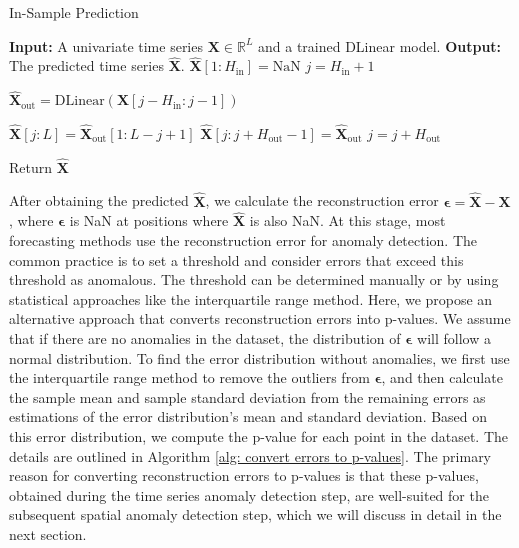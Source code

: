 \documentclass[11pt]{article}
\begin{document}
\begin{algorithm}
\caption{In-Sample Prediction}\label{alg: in-sample prediction}
\begin{algorithmic}[1] %
\State \textbf{Input:} A univariate time series $\bm{X} \in \mathbb{R}^L$ and a trained DLinear model.
\State \textbf{Output:} The predicted time series $\hat{\bm{X}}$.
\State $\hat{\bm{X}}[1:H_{\mathrm{in}}] = \mathrm{NaN}$ %
\State $j = H_{\mathrm{in}} + 1$ %

    \State $\hat{\bm{X}}_{\mathrm{out}} = \mathrm{DLinear}(\bm{X}[j-H_{\mathrm{in}}:j-1])$ %

        \State $\hat{\bm{X}}[j:L] = \hat{\bm{X}}_{\mathrm{out}}[1:L-j+1]$ %
    \Else
        \State $\hat{\bm{X}}[j:j+H_{\mathrm{out}}-1] = \hat{\bm{X}}_{\mathrm{out}}$
    \EndIf
    \State $j = j + H_{\mathrm{out}}$ %
\EndWhile

\State Return $\hat{\bm{X}}$
\end{algorithmic}
\end{algorithm}



After obtaining the predicted $\hat{\bm{X}}$, we calculate the reconstruction error $\bm{\epsilon}=\hat{\bm{X}}-\bm{X}$, where $\bm{\epsilon}$ is NaN at positions where $\hat{\bm{X}}$ is also NaN. At this stage, most forecasting methods use the reconstruction error for anomaly detection. The common practice is to set a threshold and consider errors that exceed this threshold as anomalous. The threshold can be determined manually or by using statistical approaches like the interquartile range method. Here, we propose an alternative approach that converts reconstruction errors into p-values. We assume that if there are no anomalies in the dataset, the distribution of $\bm{\epsilon}$ will follow a normal distribution. To find the error distribution without anomalies, we first use the interquartile range method to remove the outliers from $\bm{\epsilon}$, and then calculate the sample mean and sample standard deviation from the remaining errors as estimations of the error distribution's mean and standard deviation. Based on this error distribution, we compute the p-value for each point in the dataset. The details are outlined in Algorithm \ref{alg: convert errors to p-values}. The primary reason for converting reconstruction errors to p-values is that these p-values, obtained during the time series anomaly detection step, are well-suited for the subsequent spatial anomaly detection step, which we will discuss in detail in the next section.
\end{document}
